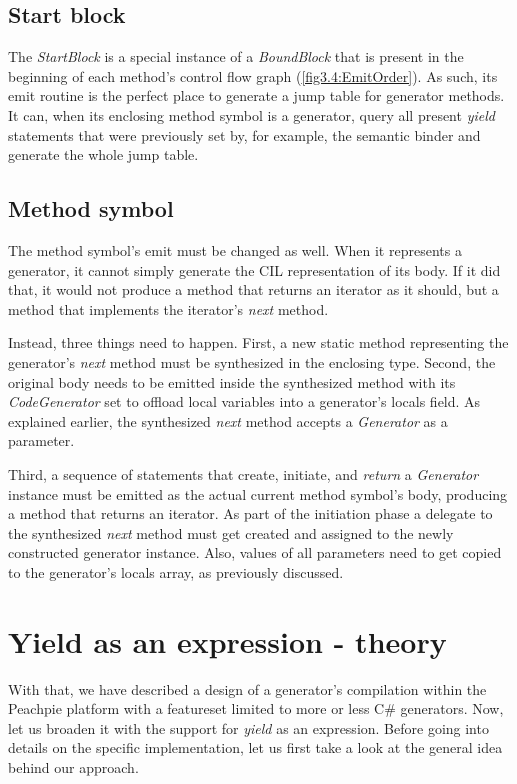 \subsection{Start block}\label{StartBlock}

The \emph{StartBlock} is a special instance of a \emph{BoundBlock} that is present in the beginning of each method’s control flow graph (\autoref{fig3.4:EmitOrder}). As such, its emit routine is the perfect place to generate a jump table for generator methods. It can, when its enclosing method symbol is a generator, query all present \emph{yield} statements that were previously set by, for example, the semantic binder and generate the whole jump table.

\subsection{Method symbol}\label{MethdSymbol}

The method symbol’s emit must be changed as well. When it represents a generator, it cannot simply generate the CIL representation of its body. If it did that, it would not produce a method that returns an iterator as it should, but a method that implements the iterator’s \emph{next} method.

Instead, three things need to happen. First, a new static method representing the generator’s \emph{next} method must be synthesized in the enclosing type. Second, the original body needs to be emitted inside the synthesized method with its \emph{CodeGenerator} set to offload local variables into a generator’s locals field. As explained earlier, the synthesized \emph{next} method accepts a \emph{Generator} as a parameter.

Third, a sequence of statements that create, initiate, and \emph{return} a \emph{Generator} instance must be emitted as the actual current method symbol’s body, producing a method that returns an iterator. As part of the initiation phase a delegate to the synthesized \emph{next} method must get created and assigned to the newly constructed generator instance. Also, values of all parameters need to get copied to the generator’s locals array, as previously discussed.

\section{Yield as an expression - theory}\label{AlghTheory}

With that, we have described a design of a generator’s compilation within the Peachpie platform with a featureset limited to more or less C\# generators. Now, let us broaden it with the support for \emph{yield} as an expression. Before going into details on the specific implementation, let us first take a look at the general idea behind our approach. 

